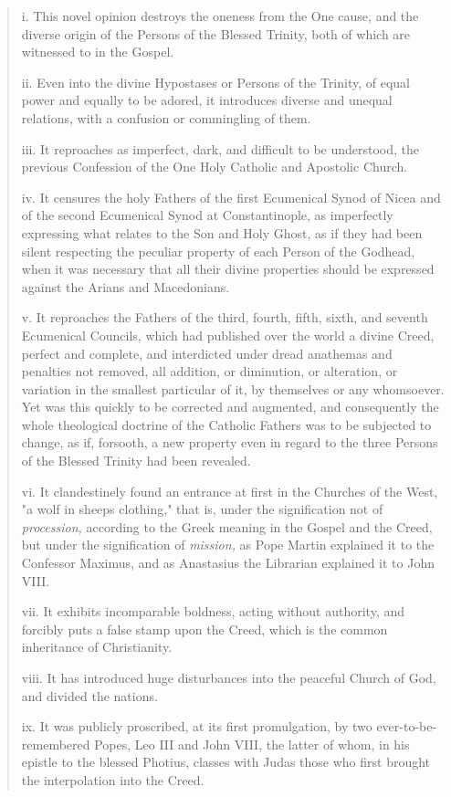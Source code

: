 \begin{quote}
i. This novel opinion destroys the oneness from the One cause, and the
diverse origin of the Persons of the Blessed Trinity, both of which are
witnessed to in the Gospel.

ii. Even into the divine Hypostases or Persons of the Trinity, of equal
power and equally to be adored, it introduces diverse and unequal
relations, with a confusion or commingling of them.

iii. It reproaches as imperfect, dark, and difficult to be understood,
the previous Confession of the One Holy Catholic and Apostolic Church.

iv. It censures the holy Fathers of the first Ecumenical Synod of Nicea
and of the second Ecumenical Synod at Constantinople, as imperfectly
expressing what relates to the Son and Holy Ghost, as if they had been
silent respecting the peculiar property of each Person of the Godhead,
when it was necessary that all their divine properties should be
expressed against the Arians and Macedonians.

v. It reproaches the Fathers of the third, fourth, fifth, sixth, and
seventh Ecumenical Councils, which had published over the world a divine
Creed, perfect and complete, and interdicted under dread anathemas and
penalties not removed, all addition, or diminution, or alteration, or
variation in the smallest particular of it, by themselves or any
whomsoever. Yet was this quickly to be corrected and augmented, and
consequently the whole theological doctrine of the Catholic Fathers was
to be subjected to change, as if, forsooth, a new property even in
regard to the three Persons of the Blessed Trinity had been revealed.

vi. It clandestinely found an entrance at first in the Churches of the
West, "a wolf in sheep\textquotesingle s clothing," that is, under the
signification not of \emph{procession,} according to the Greek meaning
in the Gospel and the Creed, but under the signification of
\emph{mission,} as Pope Martin explained it to the Confessor Maximus,
and as Anastasius the Librarian explained it to John VIII.

vii. It exhibits incomparable boldness, acting without authority, and
forcibly puts a false stamp upon the Creed, which is the common
inheritance of Christianity.

viii. It has introduced huge disturbances into the peaceful Church of
God, and divided the nations.

ix. It was publicly proscribed, at its first promulgation, by two
ever-to-be-remembered Popes, Leo III and John VIII, the latter of whom,
in his epistle to the blessed Photius, classes with Judas those who
first brought the interpolation into the Creed.


\end{quote}
